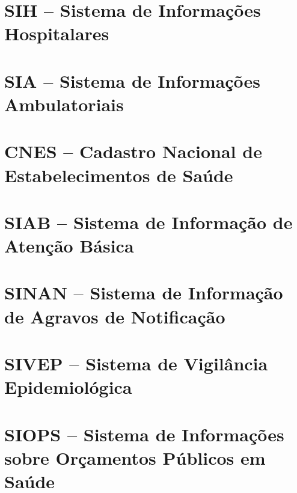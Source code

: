 \documentclass[
  letterpaper,
  DIV=11,
  numbers=noendperiod]{scrreprt}
\begin{document}

\chapter{SIH -- Sistema de Informações
Hospitalares}\label{sih-sistema-de-informauxe7uxf5es-hospitalares}


\chapter{SIA -- Sistema de Informações
Ambulatoriais}\label{sia-sistema-de-informauxe7uxf5es-ambulatoriais}


\chapter{CNES -- Cadastro Nacional de Estabelecimentos de
Saúde}\label{cnes-cadastro-nacional-de-estabelecimentos-de-sauxfade}


\chapter{SIAB -- Sistema de Informação de Atenção
Básica}\label{siab-sistema-de-informauxe7uxe3o-de-atenuxe7uxe3o-buxe1sica}


\chapter{SINAN -- Sistema de Informação de Agravos de
Notificação}\label{sinan-sistema-de-informauxe7uxe3o-de-agravos-de-notificauxe7uxe3o}


\chapter{SIVEP -- Sistema de Vigilância
Epidemiológica}\label{sivep-sistema-de-vigiluxe2ncia-epidemioluxf3gica}


\chapter{SIOPS -- Sistema de Informações sobre Orçamentos Públicos em
Saúde}\label{siops-sistema-de-informauxe7uxf5es-sobre-oruxe7amentos-puxfablicos-em-sauxfade}
\end{document}
